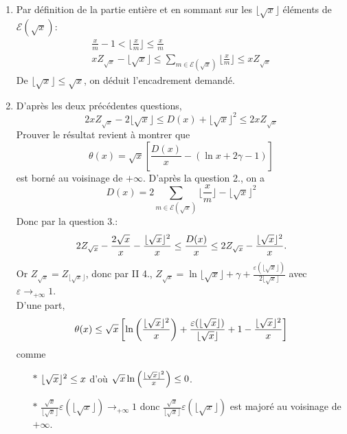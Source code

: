 \begin{enumerate}
\item Par définition de la partie entière et en sommant sur les $\lfloor\sqrt{x}\rfloor$ éléments de $\mathcal E(\sqrt{x})$:
\begin{align*}
  \frac{x}{m}-1 < \lfloor\frac{x}{m}\rfloor \leq \frac{x}{m} \\
xZ_{\sqrt{x}}-\lfloor\sqrt{x}\rfloor \leq \sum_{m\in\mathcal E(\sqrt{x})}\lfloor\frac{x}{m}\rfloor
\leq xZ_{\sqrt{x}}
\end{align*}
De $\lfloor\sqrt{x}\rfloor\leq \sqrt{x}$, on déduit l'encadrement demandé.

\item D'après les deux précédentes questions,
\begin{displaymath}
 2xZ_{\sqrt{x}}-2\lfloor\sqrt{x}\rfloor \leq D(x) +\lfloor\sqrt{x}\rfloor^2
\leq 2xZ_{\sqrt{x}}
\end{displaymath}
Prouver le résultat revient à montrer que 
\begin{displaymath}
 \theta(x)=\sqrt{x}\left[\frac{D(x)}x-(\ln x+2\gamma-1)\right] 
\end{displaymath}
est borné au voisinage de $+\infty$.\newline
D'après la question 2., on a 
$$D(x)=2\sum_{m \in \mathcal{E}(\sqrt x)}\lfloor \frac xm\rfloor-\lfloor \sqrt x\rfloor^2$$
Donc par la question 3.:
\begin{displaymath}
2Z_{\sqrt{x}}-\frac{2\sqrt x}x-\frac{\lfloor\sqrt x\rfloor^2}x\leq \frac{D(x)}x\leq 2Z_{\sqrt{x}}-\frac{\lfloor\sqrt x\rfloor^2}x.  
\end{displaymath}
Or $Z_{\sqrt{x}}=Z_{\lfloor\sqrt{x}\rfloor}$, donc  par II 4., $Z_{\sqrt{x}}=\ln \lfloor\sqrt{x}\rfloor+\gamma+\frac{\varepsilon(\lfloor\sqrt{x}\rfloor)}{2\lfloor\sqrt{x}\rfloor}$ avec $\varepsilon\to_{+\infty} 1$.\\
D'une part, 
$$\theta(x)\leq \sqrt{x}
 \left[
  \ln\left(\frac{\lfloor\sqrt{x}\rfloor^2}x\right)
 +\frac{\varepsilon(\lfloor\sqrt{x}\rfloor)}{\lfloor\sqrt{x}\rfloor} 
 + 1-\frac{\lfloor\sqrt{x}\rfloor^2}x
 \right]$$
comme
\begin{itemize}
\item[$\ast$] $\lfloor\sqrt{x}\rfloor^2\leq x$ d'où $\sqrt{x}\ln\left(\frac{\lfloor\sqrt{x}\rfloor^2}x\right)\leq 0$.
\item[$\ast$] $\frac {\sqrt x}{\lfloor\sqrt{x}\rfloor}\varepsilon(\lfloor\sqrt{x}\rfloor)\to_{+\infty} 1$ donc $\frac {\sqrt x}{\lfloor\sqrt{x}\rfloor}\varepsilon(\lfloor\sqrt{x}\rfloor)$ est majoré au voisinage de $+\infty$.

\end{itemize}
\end{enumerate}
